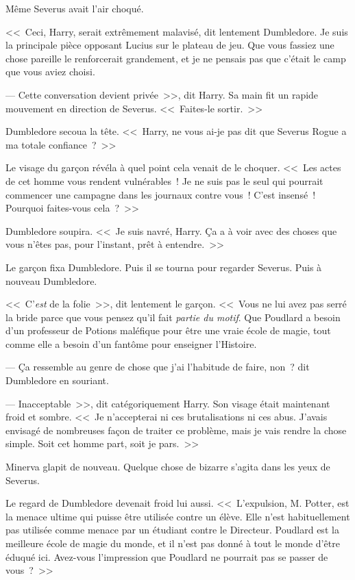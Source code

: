 Même Severus avait l'air choqué.

<<~Ceci, Harry, serait extrêmement malavisé, dit lentement Dumbledore. Je suis la principale pièce opposant Lucius sur le plateau de jeu. Que vous fassiez une chose pareille le renforcerait grandement, et je ne pensais pas que c'était le camp que vous aviez choisi.

--- Cette conversation devient privée~>>, dit Harry. Sa main fit un rapide mouvement en direction de Severus. <<~Faites-le sortir.~>>

Dumbledore secoua la tête. <<~Harry, ne vous ai-je pas dit que Severus Rogue a ma totale confiance~?~>>

Le visage du garçon révéla à quel point cela venait de le choquer. <<~Les actes de cet homme vous rendent vulnérables~! Je ne suis pas le seul qui pourrait commencer une campagne dans les journaux contre vous~! C'est insensé~! Pourquoi faites-vous cela~?~>>

Dumbledore soupira. <<~Je suis navré, Harry. Ça a à voir avec des choses que vous n'êtes pas, pour l'instant, prêt à entendre.~>>

Le garçon fixa Dumbledore. Puis il se tourna pour regarder Severus. Puis à nouveau Dumbledore.

<<~C'\emph{est} de la folie~>>, dit lentement le garçon. <<~Vous ne lui avez pas serré la bride parce que vous pensez qu'il fait \emph{partie du motif}. Que Poudlard a besoin d'un professeur de Potions maléfique pour être une vraie école de magie, tout comme elle a besoin d'un fantôme pour enseigner l'Histoire.

--- Ça ressemble au genre de chose que j'ai l'habitude de faire, non~? dit Dumbledore en souriant.

--- Inacceptable~>>, dit catégoriquement Harry. Son visage était maintenant froid et sombre. <<~Je n'accepterai ni ces brutalisations ni ces abus. J'avais envisagé de nombreuses façon de traiter ce problème, mais je vais rendre la chose simple. Soit cet homme part, soit je pars.~>>

Minerva glapit de nouveau. Quelque chose de bizarre s'agita dans les yeux de Severus.

Le regard de Dumbledore devenait froid lui aussi. <<~L'expulsion, M. Potter, est la menace ultime qui puisse être utilisée contre un élève. Elle n'est habituellement pas utilisée comme menace par un étudiant contre le Directeur. Poudlard est la meilleure école de magie du monde, et il n'est pas donné à tout le monde d'être éduqué ici. Avez-vous l'impression que Poudlard ne pourrait pas se passer de vous~?~>>

